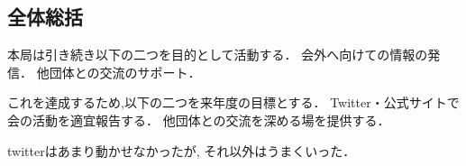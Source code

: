 \subsection*{全体総括}


本局は引き続き以下の二つを目的として活動する．
    会外へ向けての情報の発信．
    他団体との交流のサポート．
 
これを達成するため,以下の二つを来年度の目標とする．
    Twitter・公式サイトで会の活動を適宜報告する．
    他団体との交流を深める場を提供する．

twitterはあまり動かせなかったが, それ以外はうまくいった．

